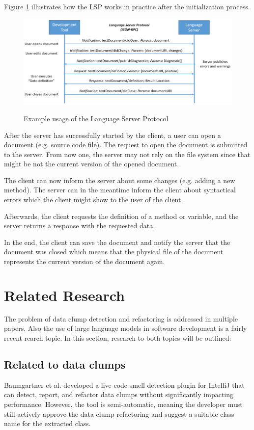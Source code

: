 Figure \ref{fig:lsp_usage} illustrates how the \ac{LSP} works in practice after the initialization process. 
\begin{figure}
    \centering
    \includegraphics{figures/chapter2/language-server-sequence.png}
    \caption{Example usage of the Language Server Protocol}
    \label{fig:lsp_usage}
    \cite{lsp_website}
\end{figure}

After the server has successfully started by the client, a user can open a document (e.g. source code file). The request to open the document is submitted to the server. From now one, the server may not rely on the file system since that might be not the current version of the opened document. 

The client can now inform the server about some changes (e.g. adding a new method). The server can in the meantime inform the client about syntactical errors which the client might show to the user of the client.

Afterwards, the client requests the definition of a method or variable, and the server returns a response with the requested data.

In the end, the client can save the document and notify the server that the document was closed which means that the physical file of the document represents the current version of the document again. 



\section{Related Research}\label{sec:related_research}
The problem of data clump detection and refactoring is addressed in multiple papers. Also the  use of large language models in software development is a fairly recent rearch topic. In this section, research to both topics will be outlined: 

\subsection{Related to data clumps}
Baumgartner et al.  developed a live code smell detection plugin for IntelliJ that can detect, report, and refactor data clumps without significantly impacting performance. However, the tool is semi-automatic, meaning the developer must still actively approve the data clump refactoring and suggest a suitable class name for the extracted class. \cite{BaumgartnerAP23}

